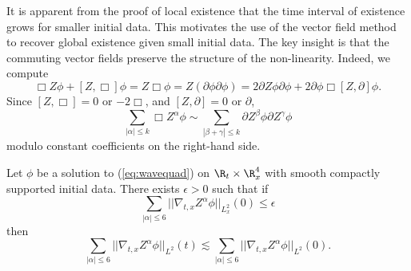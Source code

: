 It is apparent from the proof of local existence that the time interval of existence grows for smaller initial data. This motivates the use of the vector field method to recover global existence given small initial data. The key insight is that the commuting vector fields preserve the structure of the non-linearity. Indeed, we compute
	\[ \Box Z \phi + [Z, \Box] \phi = Z \Box \phi = Z (\partial \phi \partial \phi) = 2 \partial Z \phi \partial \phi + 2\partial \phi \Box[Z, \partial] \phi.\]
Since $[Z, \Box] = 0$ or $-2\Box$, and $[Z, \partial] = 0$ or $\partial$, 
	\[ \sum_{|\alpha| \leq k} \Box Z^\alpha \phi \sim \sum_{|\beta + \gamma| \leq k} \partial Z^{\beta} \phi \partial Z^{\gamma} \phi  \]
modulo constant coefficients on the right-hand side. 

\begin{theorem}
	Let $\phi$ be a solution to (\ref{eq:wavequad}) on $\R_t \times \R^4_x$ with smooth compactly supported initial data. There exists $\epsilon > 0$ such that if 
		\[ \sum_{|\alpha| \leq 6} ||\nabla_{t, x} Z^\alpha \phi||_{L^2_x} (0) \leq \epsilon \]
	then
		\[ \sum_{|\alpha| \leq 6} ||\nabla_{t, x} Z^\alpha \phi||_{L^2} (t) \lesssim \sum_{|\alpha| \leq 6} ||\nabla_{t, x} Z^{\alpha} \phi||_{L^2} (0). \]	\label{thm:nonlin2}
\end{theorem}

